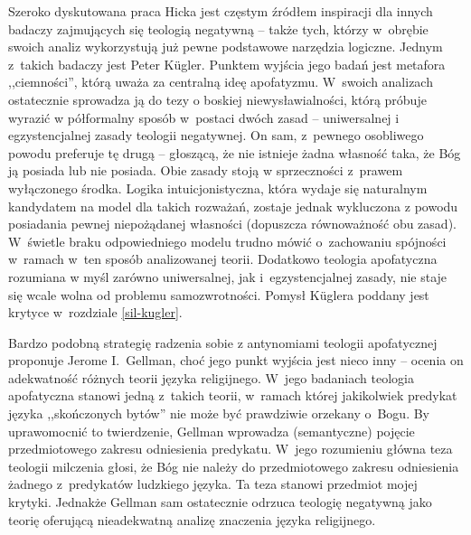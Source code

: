 Szeroko dyskutowana praca Hicka jest częstym źródłem inspiracji dla innych badaczy zajmujących się teologią negatywną -- także tych, którzy w~obrębie swoich analiz wykorzystują już pewne podstawowe narzędzia logiczne. Jednym z~takich badaczy jest Peter Kügler.
Punktem wyjścia jego badań jest metafora ,,ciemności'', którą uważa za centralną ideę apofatyzmu. W~swoich analizach ostatecznie sprowadza ją do tezy o boskiej niewysławialności, którą próbuje wyrazić w półformalny sposób w~postaci dwóch zasad -- uniwersalnej i egzystencjalnej zasady teologii negatywnej. On sam, z~pewnego osobliwego powodu preferuje tę drugą -- głoszącą, że nie istnieje żadna własność
taka, że Bóg ją posiada lub nie posiada.
Obie zasady stoją w sprzeczności z~prawem wyłączonego środka. Logika intuicjonistyczna, która wydaje się naturalnym kandydatem na model dla takich rozważań, zostaje jednak wykluczona z powodu posiadania pewnej niepożądanej własności (dopuszcza równoważność obu zasad). W~świetle braku odpowiedniego modelu trudno mówić o~zachowaniu spójności w~ramach w~ten sposób analizowanej teorii. Dodatkowo teologia apofatyczna rozumiana w myśl zarówno uniwersalnej, jak i~egzystencjalnej zasady, nie staje się wcale wolna od problemu samozwrotności.
Pomysł Küglera poddany jest krytyce w~rozdziale \ref{sil-kugler}.

Bardzo podobną strategię radzenia sobie z antynomiami teologii apofatycznej proponuje Jerome I.~Gellman, choć jego punkt wyjścia jest nieco inny -- 
ocenia on adekwatność różnych teorii języka religijnego. W~jego badaniach teologia apofatyczna stanowi jedną z~takich teorii, w~ramach której jakikolwiek predykat języka ,,skończonych bytów'' nie może być prawdziwie orzekany o~Bogu. By uprawomocnić to twierdzenie, Gellman wprowadza (semantyczne) pojęcie przedmiotowego zakresu odniesienia predykatu. W~jego rozumieniu główna teza teologii milczenia głosi, że Bóg nie należy do przedmiotowego zakresu odniesienia żadnego z~predykatów ludzkiego języka. Ta teza stanowi przedmiot mojej krytyki. Jednakże Gellman sam ostatecznie odrzuca teologię negatywną jako teorię oferującą nieadekwatną analizę znaczenia języka religijnego.

